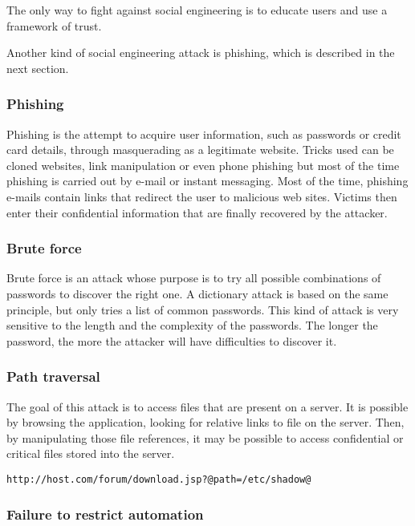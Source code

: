 The only way to fight against social engineering is to educate users and use a
framework of trust.

Another kind of social engineering attack is phishing, which is described in
the next section.

\subsubsection{Phishing}

Phishing is the attempt to acquire user information, such as passwords or credit
card details, through masquerading as a legitimate website. Tricks used can be
cloned websites, link manipulation or even phone phishing but most of the time
phishing is carried out by e-mail or instant messaging. Most of the time,
phishing e-mails contain links that redirect the user to malicious web sites.
Victims then enter their confidential information that are finally recovered
by the attacker.

\subsubsection{Brute force}

Brute force is an attack whose purpose is to try all possible combinations of
passwords to discover the right one. A dictionary attack is based on the same
principle, but only tries a list of common passwords.
This kind of attack is very sensitive to the length and the complexity of the
passwords. The longer the password, the more the attacker will have
difficulties to discover it.

\subsubsection{Path traversal}

The goal of this attack is to access files that are present on a server. It
is possible by browsing the application, looking for relative links to file on
the server. Then, by manipulating those file references, it may be possible to
access confidential or critical files stored into the server.

\begin{lstlisting}[style=beamer,
	caption={Getting a file from the server}]
http://host.com/forum/download.jsp?@path=/etc/shadow@
\end{lstlisting}

\subsubsection{Failure to restrict automation}

